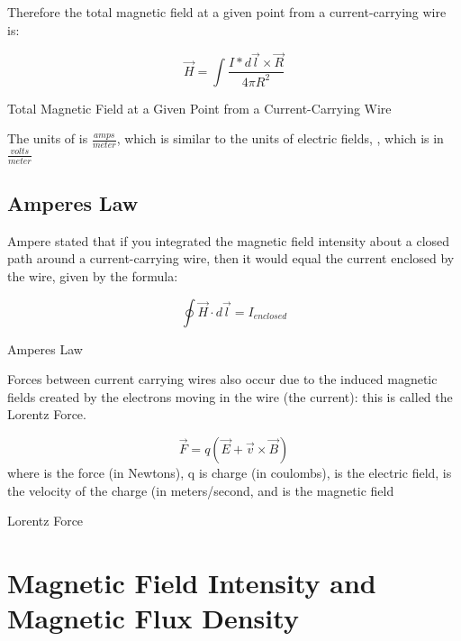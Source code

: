 \documentclass[12pt, letterpaper]{memoir}
\begin{document}
Therefore the total magnetic field at a given point from a current-carrying wire is:

\begin{eqlisting} \label{magfield2}
	\begin{equation}
	\overrightarrow{H} = \int \! \frac{I*d\overrightarrow{l} \times \overrightarrow{R}}{4 \pi R^2}
	\end{equation}
\caption{\scriptsize Total Magnetic Field at a Given Point from a Current-Carrying Wire}
\end{eqlisting}

The units of \textbf{} is $\frac{amps}{meter}$, which is similar to the units of electric fields, \textbf{}, which is in $\frac{volts}{meter}$

\subsection{Amperes Law}
Ampere stated that if you integrated the magnetic field intensity about a closed path around a current-carrying wire, then it would equal the current enclosed by the wire, given by the formula:

\begin{eqlisting}
	\begin{equation}
	\oint \overrightarrow{H} \cdot d\overrightarrow{l} = I_{enclosed}
	\end{equation}
\caption{\scriptsize Amperes Law}
\end{eqlisting}

Forces between current carrying wires also occur due to the induced magnetic fields created by the electrons moving in the wire (the current): this is called the Lorentz Force.

\begin{eqlisting}
	\begin{equation}
	\overrightarrow{F} = q(\overrightarrow{E} + \overrightarrow{v} \times \overrightarrow{B})
	\end{equation}
\tiny where  is the force (in Newtons), q is charge (in coulombs),  is the electric field,  is the velocity of the charge (in meters/second, and  is the magnetic field
	\caption{Lorentz Force}
\end{eqlisting}

\section{Magnetic Field Intensity and Magnetic Flux Density}
\end{document}

